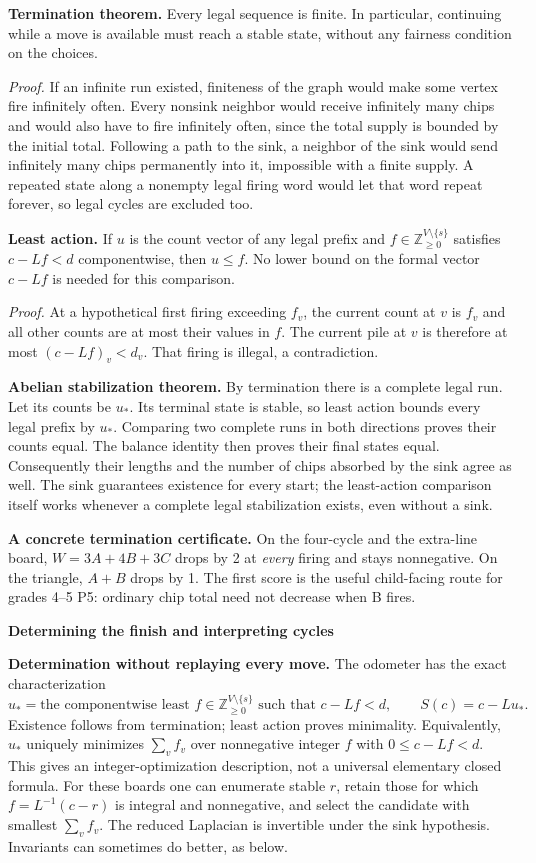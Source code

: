 \documentclass[11pt,letterpaper]{article}
\newcommand{\pagehead}[1]{{\Large\bfseries #1}\par\vspace{3pt}}
\begin{document}
\textbf{Termination theorem.} Every legal sequence is finite. In particular, continuing while a move is available must reach a stable state, without any fairness condition on the choices.

\emph{Proof.} If an infinite run existed, finiteness of the graph would make some vertex fire infinitely often. Every nonsink neighbor would receive infinitely many chips and would also have to fire infinitely often, since the total supply is bounded by the initial total. Following a path to the sink, a neighbor of the sink would send infinitely many chips permanently into it, impossible with a finite supply. A repeated state along a nonempty legal firing word would let that word repeat forever, so legal cycles are excluded too.

\textbf{Least action.} If $u$ is the count vector of any legal prefix and $f\in\mathbb Z_{\ge0}^{V\setminus\{s\}}$ satisfies $c-Lf<d$ componentwise, then $u\le f$. No lower bound on the formal vector $c-Lf$ is needed for this comparison.

\emph{Proof.} At a hypothetical first firing exceeding $f_v$, the current count at $v$ is $f_v$ and all other counts are at most their values in $f$. The current pile at $v$ is therefore at most $(c-Lf)_v<d_v$. That firing is illegal, a contradiction.

\textbf{Abelian stabilization theorem.} By termination there is a complete legal run. Let its counts be $u_*$. Its terminal state is stable, so least action bounds every legal prefix by $u_*$. Comparing two complete runs in both directions proves their counts equal. The balance identity then proves their final states equal. Consequently their lengths and the number of chips absorbed by the sink agree as well. The sink guarantees existence for every start; the least-action comparison itself works whenever a complete legal stabilization exists, even without a sink.

\textbf{A concrete termination certificate.} On the four-cycle and the extra-line board, $W=3A+4B+3C$ drops by 2 at \emph{every} firing and stays nonnegative. On the triangle, $A+B$ drops by 1. The first score is the useful child-facing route for grades 4--5 P5: ordinary chip total need not decrease when B fires.

\newpage
\pagehead{Determining the finish and interpreting cycles}\label{determination}
\textbf{Determination without replaying every move.} The odometer has the exact characterization
\[
u_* = \text{the componentwise least }f\in\mathbb Z_{\ge0}^{V\setminus\{s\}}
       \text{ such that } c-Lf<d,
\qquad S(c)=c-Lu_*.
\]
Existence follows from termination; least action proves minimality. Equivalently, $u_*$ uniquely minimizes $\sum_v f_v$ over nonnegative integer $f$ with $0\le c-Lf<d$. This gives an integer-optimization description, not a universal elementary closed formula. For these boards one can enumerate stable $r$, retain those for which $f=L^{-1}(c-r)$ is integral and nonnegative, and select the candidate with smallest $\sum_v f_v$. The reduced Laplacian is invertible under the sink hypothesis. Invariants can sometimes do better, as below.
\end{document}
